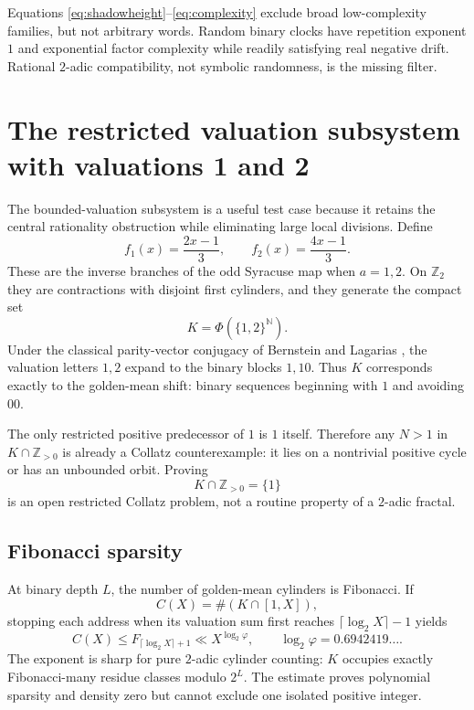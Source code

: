 \documentclass[11pt,reqno]{amsart}
\theoremstyle{plain}
\theoremstyle{definition}
\numberwithin{equation}{section}
\newcommand{\N}{\mathbb{N}}
\newcommand{\Z}{\mathbb{Z}}
\newcommand{\Zp}[1]{\mathbb{Z}_{#1}}
\begin{document}
Equations \eqref{eq:shadowheight}--\eqref{eq:complexity} exclude broad
low-complexity families, but not arbitrary words.  Random binary clocks have
repetition exponent $1$ and exponential factor complexity while readily
satisfying real negative drift.  Rational $2$-adic compatibility, not symbolic
randomness, is the missing filter.

\section{The restricted valuation subsystem with valuations 1 and 2}
\label{sec:restricted}

The bounded-valuation subsystem is a useful test case because it retains the
central rationality obstruction while eliminating large local divisions.
Define
\begin{equation}\label{eq:branches}
f_1(x)=\frac{2x-1}{3},
\qquad
f_2(x)=\frac{4x-1}{3}.
\end{equation}
These are the inverse branches of the odd Syracuse map when $a=1,2$.  On
$\Zp{2}$ they are contractions with disjoint first cylinders, and they
generate the compact set
\[
K=\Phi(\{1,2\}^{\N}).
\]
Under the classical parity-vector conjugacy of Bernstein and Lagarias
\cite{bernsteinlagarias1996}, the valuation letters $1,2$ expand to the binary
blocks $1,10$.  Thus $K$ corresponds exactly to the golden-mean shift: binary
sequences beginning with $1$ and avoiding $00$.

The only restricted positive predecessor of $1$ is $1$ itself.  Therefore any
$N>1$ in $K\cap\Z_{>0}$ is already a Collatz counterexample: it lies on
a nontrivial positive cycle or has an unbounded orbit.  Proving
\begin{equation}\label{eq:restricted}
K\cap\Z_{>0}=\{1\}
\end{equation}
is an open restricted Collatz problem, not a routine property of a $2$-adic
fractal.

\subsection{Fibonacci sparsity}

At binary depth $L$, the number of golden-mean cylinders is Fibonacci.  If
\[
C(X)=\#(K\cap[1,X]),
\]
stopping each address when its valuation sum first reaches
$\lceil\log_2X\rceil-1$ yields
\begin{equation}\label{eq:fibonacci}
C(X)\le F_{\lceil\log_2X\rceil+1}
\ll X^{\log_2\varphi},
\qquad
\log_2\varphi=0.6942419\ldots.
\end{equation}
The exponent is sharp for pure $2$-adic cylinder counting: $K$ occupies
exactly Fibonacci-many residue classes modulo $2^L$.  The estimate proves
polynomial sparsity and density zero but cannot exclude one isolated positive
integer.
\end{document}
